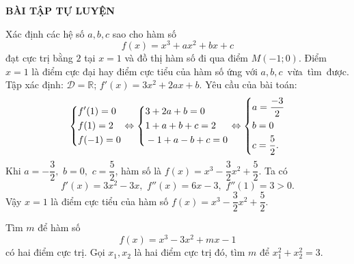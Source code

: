 \begin{center}\textbf{BÀI TẬP TỰ LUYỆN}\end{center}

\begin{bt}%
	Xác định các hệ số $a,b,c$ sao cho hàm số $$f(x) = x^3  + ax^2  + bx + c$$ đạt cực trị bằng $2$ tại $x = 1$ và đồ thị hàm số đi qua điểm $M( - 1;0)$. Điểm $x = 1$ là điểm cực đại hay điểm cực tiểu của hàm số ứng với \mbox{$a, b, c$ vừa tìm được.}
	\loigiai
	{
		Tập xác định: $\mathscr{D}=\mathbb{R}$;  $f'(x) = 3x^2  + 2ax + b$. Yêu cầu của bài toán:
		$$\left\{\begin{aligned}&f'(1) = 0 \\&f(1) = 2 \\&f( - 1) = 0\end{aligned}\right.
		\Leftrightarrow \left\{\begin{aligned}&3 + 2a + b = 0 \\&1 + a + b + c = 2 \\&- 1 + a - b + c = 0\end{aligned}\right.
		\Leftrightarrow \left\{\begin{aligned}&a = \dfrac{{ - 3}}{2} \\&b = 0 \\&c = \dfrac{5}{2}.\end{aligned}\right.
		$$
		Khi $a =  - \dfrac{3}{2},\,\,b = 0,\,\,c = \dfrac{5}{2}$, hàm số là $f(x) = x^3  - \dfrac{3}{2}x^2  + \dfrac{5}{2}$. Ta có
		$$f'(x) = 3x^2  - 3x,\,\,f''(x) = 6x - 3,\,\,f''(1) = 3 > 0.$$
		Vậy $x = 1$ là điểm cực tiểu của hàm số $f(x) = x^3  - \dfrac{3}{2}x^2  + \dfrac{5}{2}$.
	}
\end{bt}

\begin{bt}%
	Tìm $m$ để hàm số $$f(x) = x^3 - 3x^2 + mx - 1$$ có hai điểm cực trị. Gọi $x_1, x_2$ là hai điểm cực trị đó, tìm $m$ để $x_1^2 + x_2^2 = 3$.
\end{bt}


